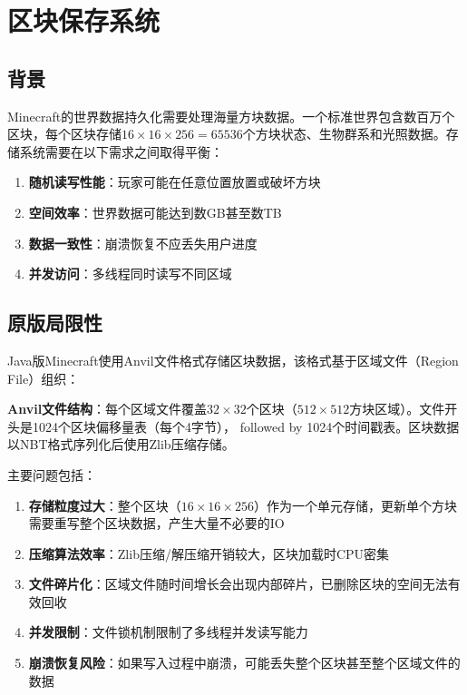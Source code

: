 \section{区块保存系统}
\label{sec:chunk_storage}

\subsection{背景}

Minecraft的世界数据持久化需要处理海量方块数据。一个标准世界包含数百万个区块，每个区块存储$16\times16\times256=65536$个方块状态、生物群系和光照数据。存储系统需要在以下需求之间取得平衡：

\begin{enumerate}
    \item \textbf{随机读写性能}：玩家可能在任意位置放置或破坏方块
    \item \textbf{空间效率}：世界数据可能达到数GB甚至数TB
    \item \textbf{数据一致性}：崩溃恢复不应丢失用户进度
    \item \textbf{并发访问}：多线程同时读写不同区域
\end{enumerate}

\subsection{原版局限性}

Java版Minecraft使用Anvil文件格式存储区块数据，该格式基于区域文件（Region File）组织：

\textbf{Anvil文件结构}：每个区域文件覆盖$32\times32$个区块（$512\times512$方块区域）。文件开头是1024个区块偏移量表（每个4字节）， followed by 1024个时间戳表。区块数据以NBT格式序列化后使用Zlib压缩存储。

主要问题包括：

\begin{enumerate}
    \item \textbf{存储粒度过大}：整个区块（$16\times16\times256$）作为一个单元存储，更新单个方块需要重写整个区块数据，产生大量不必要的IO
    \item \textbf{压缩算法效率}：Zlib压缩/解压缩开销较大，区块加载时CPU密集
    \item \textbf{文件碎片化}：区域文件随时间增长会出现内部碎片，已删除区块的空间无法有效回收
    \item \textbf{并发限制}：文件锁机制限制了多线程并发读写能力
    \item \textbf{崩溃恢复风险}：如果写入过程中崩溃，可能丢失整个区块甚至整个区域文件的数据
\end{enumerate}

